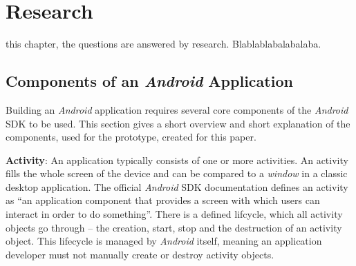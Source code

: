 %



\section{Research}

 this chapter, the questions are answered by research. Blablablabalabalaba.

\subsection{Components of an \emph{Android} Application}

Building an \emph{Android} application requires several core components of the \emph{Android} SDK to be used. This section gives a short overview and short explanation of the components, used for the prototype, created for this paper.

\textbf{Activity}: An application typically consists of one or more activities. An activity fills the whole screen of the device and can be compared to a \emph{window} in a classic desktop application. The official \emph{Android} SDK documentation \cite{SDKActivities} defines an activity as \enquote{an application component that provides a screen with which users can interact in order to do something}.
There is a defined lifcycle, which all activity objects go through -- the creation, start, stop and the destruction of an activity object. This lifecycle is managed by \emph{Android} itself, meaning an application developer must not manually create or destroy activity objects.

